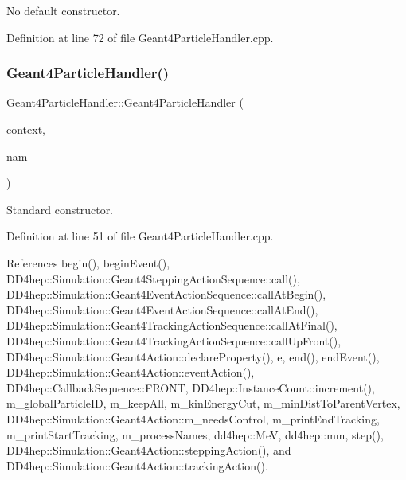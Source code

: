 No default constructor. 



Definition at line 72 of file Geant4\+Particle\+Handler.\+cpp.

\hypertarget{class_d_d4hep_1_1_simulation_1_1_geant4_particle_handler_a73b0d7c5a9dc15fd03ca4993382d6795}{}\label{class_d_d4hep_1_1_simulation_1_1_geant4_particle_handler_a73b0d7c5a9dc15fd03ca4993382d6795} 
\subsubsection{\texorpdfstring{Geant4\+Particle\+Handler()}{Geant4ParticleHandler()}\hspace{0.1cm}{\footnotesize\ttfamily [2/2]}}
{\footnotesize\ttfamily Geant4\+Particle\+Handler\+::\+Geant4\+Particle\+Handler (\begin{DoxyParamCaption}\item[{\hyperlink{class_d_d4hep_1_1_simulation_1_1_geant4_context}{Geant4\+Context} $\ast$}]{context,  }\item[{const std\+::string \&}]{nam }\end{DoxyParamCaption})}



Standard constructor. 



Definition at line 51 of file Geant4\+Particle\+Handler.\+cpp.



References begin(), begin\+Event(), D\+D4hep\+::\+Simulation\+::\+Geant4\+Stepping\+Action\+Sequence\+::call(), D\+D4hep\+::\+Simulation\+::\+Geant4\+Event\+Action\+Sequence\+::call\+At\+Begin(), D\+D4hep\+::\+Simulation\+::\+Geant4\+Event\+Action\+Sequence\+::call\+At\+End(), D\+D4hep\+::\+Simulation\+::\+Geant4\+Tracking\+Action\+Sequence\+::call\+At\+Final(), D\+D4hep\+::\+Simulation\+::\+Geant4\+Tracking\+Action\+Sequence\+::call\+Up\+Front(), D\+D4hep\+::\+Simulation\+::\+Geant4\+Action\+::declare\+Property(), e, end(), end\+Event(), D\+D4hep\+::\+Simulation\+::\+Geant4\+Action\+::event\+Action(), D\+D4hep\+::\+Callback\+Sequence\+::\+F\+R\+O\+NT, D\+D4hep\+::\+Instance\+Count\+::increment(), m\+\_\+global\+Particle\+ID, m\+\_\+keep\+All, m\+\_\+kin\+Energy\+Cut, m\+\_\+min\+Dist\+To\+Parent\+Vertex, D\+D4hep\+::\+Simulation\+::\+Geant4\+Action\+::m\+\_\+needs\+Control, m\+\_\+print\+End\+Tracking, m\+\_\+print\+Start\+Tracking, m\+\_\+process\+Names, dd4hep\+::\+MeV, dd4hep\+::mm, step(), D\+D4hep\+::\+Simulation\+::\+Geant4\+Action\+::stepping\+Action(), and D\+D4hep\+::\+Simulation\+::\+Geant4\+Action\+::tracking\+Action().

